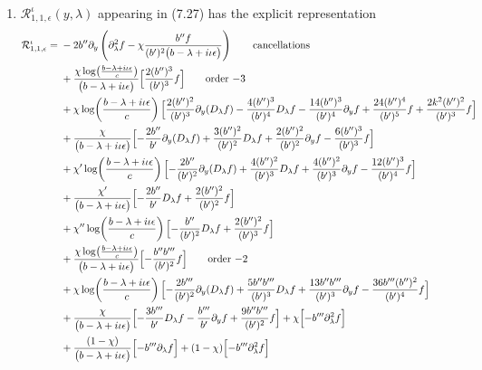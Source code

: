 \documentclass[reqno,11pt]{amsart}
\numberwithin{equation}{section}
\newcommand{\p}{\partial}
\newcommand{\D}{D_\lambda}
\numberwithin{equation}{section} %
\begin{document}
\begin{enumerate}
\item $\mathcal{R}^\iota_{1,1,\epsilon}(y,\lambda)$ appearing in (7.27) has the explicit representation
\setlength{\jot}{3pt}
\begin{align}
\mathcal{R}^\iota_{1,1,\epsilon}={}&-2b'' \p_y\left(\p_\lambda^2 f-\chi\frac{b''  f}{(b' )^{2}\bigl(b -\lambda+i\iota\epsilon\bigr)}\right)\tag*{\text{cancellations}}\\
&+\frac{\chi\log\!\left(\frac{b -\lambda+i\iota\epsilon}{c}\right)}{\bigl(b -\lambda+i\iota\epsilon\bigr)}\Bigl[\frac{2 (b'' )^{3}}{(b' )^{3}} f\Bigr]\tag*{\text{order $-3$}}\\
&+\chi\log\!\left(\frac{b -\lambda+i\iota\epsilon}{c}\right)\Bigl[\frac{2 (b'' )^{2}}{(b' )^{3}} \p_y(\D f)- \frac{4 (b'' )^{3}}{(b' )^{4}} \D f- \frac{14 (b'' )^{3}}{(b' )^{4}} \p_y f+\frac{24 (b'' )^{4}}{(b' )^{5}} f+\frac{2 k^2 (b'' )^{2}}{(b' )^{3}} f\Bigr]\notag\\
&+\frac{\chi}{\bigl(b -\lambda+i\iota\epsilon\bigr)}\Bigl[- \frac{2 b'' }{b' } \p_y(\D f)+\frac{3 (b'' )^{2}}{(b' )^{2}} \D f+\frac{2 (b'' )^{2}}{(b' )^{2}} \p_y f- \frac{6 (b'' )^{3}}{(b' )^{3}} f\Bigr]\notag\\
&+\chi'\log\!\left(\frac{b -\lambda+i\iota\epsilon}{c}\right)\Bigl[- \frac{2 b'' }{(b' )^{2}} \p_y(\D f)+\frac{4 (b'' )^{2}}{(b' )^{3}} \D f+\frac{4 (b'' )^{2}}{(b' )^{3}} \p_y f - \frac{12 (b'' )^{3}}{(b' )^{4}} f\Bigr]\notag\\
&+\frac{\chi'}{\bigl(b -\lambda+i\iota\epsilon\bigr)}\Bigl[- \frac{2 b'' }{b' } \D f+\frac{2 (b'' )^{2}}{(b' )^{2}} f\Bigr]\notag\\
&+\chi''\log\!\left(\frac{b -\lambda+i\iota\epsilon}{c}\right)\Bigl[- \frac{b'' }{(b' )^{2}} \D f+\frac{2 (b'' )^{2}}{(b' )^{3}} f\Bigr]\notag\\
&+\frac{\chi\log\!\left(\frac{b -\lambda+i\iota\epsilon}{c}\right)}{\bigl(b -\lambda+i\iota\epsilon\bigr)}\Bigl[- \frac{b''  b''' }{(b' )^{2}} f\Bigr]\tag*{\text{order $-2$}}\\
&+\chi\log\!\left(\frac{b -\lambda+i\iota\epsilon}{c}\right)\Bigl[- \frac{2 b''' }{(b' )^{2}} \p_y(\D f)+\frac{5 b''  b''' }{(b' )^{3}} \D f+\frac{13 b''  b''' }{(b' )^{3}} \p_y f- \frac{36 b'''  (b'' )^{2}}{(b' )^{4}} f\Bigr]\notag\\
&+\frac{\chi}{\bigl(b -\lambda+i\iota\epsilon\bigr)}\Bigl[- \frac{3 b''' }{b' } \D f- \frac{b''' }{b' } \p_y f+\frac{9 b''  b''' }{(b' )^{2}} f\Bigr]+\chi\Bigl[- b'''  \p_\lambda^2 f\Bigr]\notag\\
&+\frac{(1-\chi)}{\bigl(b -\lambda+i\iota\epsilon\bigr)}\Bigl[- b'''  \p_\lambda f\Bigr]+(1-\chi)\Bigl[- b'''  \p_\lambda^2 f\Bigr]\notag\\

\end{align}
\end{enumerate}
\end{document}
